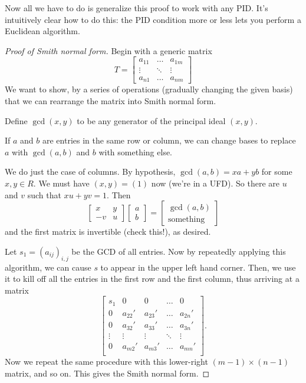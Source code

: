 Now all we have to do is generalize this proof to work
with any PID. It's intuitively clear how to do this:
the PID condition more or less lets you perform a Euclidean algorithm.

\begin{proof}
	[Proof of Smith normal form]
	Begin with a generic matrix
	\[ T = \begin{bmatrix}
		a_{11} & \dots & a_{1m} \\
		\vdots & \ddots & \vdots \\
		a_{n1} & \dots & a_{nm}
	\end{bmatrix} \]
	We want to show, by a series of operations (gradually changing the given basis)
	that we can rearrange the matrix into Smith normal form.

	Define $\gcd(x,y)$ to be any generator of the principal ideal $(x,y)$.
	\begin{claim}
		If $a$ and $b$ are entries in the same row or column,
		we can change bases to replace $a$ with $\gcd(a,b)$
		and $b$ with something else.
	\end{claim}
	\begin{subproof}
		We do just the case of columns.
		By hypothesis, $\gcd(a,b) = xa+yb$ for some $x,y \in R$.
		We must have $(x,y) = (1)$ now (we're in a UFD).
		So there are $u$ and $v$ such that $xu + yv = 1$.
		Then
		\[
			\begin{bmatrix} x & y \\ -v & u \end{bmatrix}
			\begin{bmatrix} a \\ b  \end{bmatrix}
			= \begin{bmatrix} \gcd(a,b) \\ \text{something} \end{bmatrix}
		\]
		and the first matrix is invertible (check this!), as desired.
	\end{subproof}
	Let $s_1 = (a_{ij})_{i,j}$ be the GCD of all entries.
	Now by repeatedly applying this algorithm,
	we can cause $s$ to appear in the upper left hand corner.
	Then, we use it to kill off all the entries in the first
	row and the first column, thus arriving at a matrix
	\[ \begin{bmatrix}
		s_1 & 0 & 0 & \dots & 0 \\
		0 & a_{22}' & a_{23}' & \dots & a_{2n}' \\
		0 & a_{32}' & a_{33}' & \dots & a_{3n}' \\
		\vdots&\vdots&\vdots&\ddots&\vdots \\
		0 & a_{m2}' & a_{m3}' & \dots & a_{mn}' \\
	\end{bmatrix}. \]
	Now we repeat the same procedure with this lower-right
	$(m-1) \times (n-1)$ matrix, and so on.
	This gives the Smith normal form.
\end{proof}

